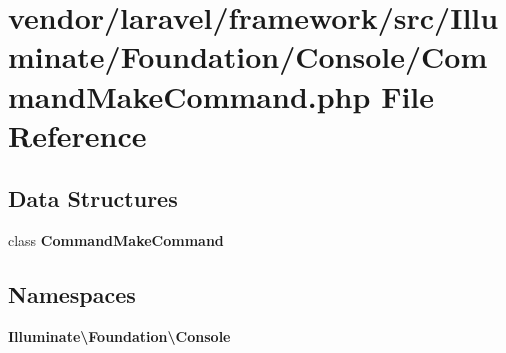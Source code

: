 \section{vendor/laravel/framework/src/\+Illuminate/\+Foundation/\+Console/\+Command\+Make\+Command.php File Reference}
\label{_command_make_command_8php}
\subsection*{Data Structures}
\begin{DoxyCompactItemize}
\item 
class {\bf Command\+Make\+Command}
\end{DoxyCompactItemize}
\subsection*{Namespaces}
\begin{DoxyCompactItemize}
\item 
 {\bf Illuminate\textbackslash{}\+Foundation\textbackslash{}\+Console}
\end{DoxyCompactItemize}
